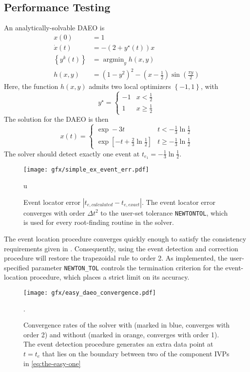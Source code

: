 \documentclass[twoside,leqno,twocolumn]{article}
\newcommand{\abs}[1]{\ensuremath{\left|#1\right|}}
\DeclareMathOperator*{\argmin}{\arg\min}
\begin{document}
\subsection{Performance Testing}
An analytically-solvable DAEO is
\begin{equation}
	\label{eq:the-easy-one}
	\begin{aligned}
		x(0) &= 1\\
		\dot x(t) &= -(2+y^\star(t))x\\
		\left\{y^k(t)\right\} &= \argmin_y h(x,y)\\
		h(x, y) &= (1-y^2)^2 - (x-\frac{1}{2})\sin\left(\frac{\pi y}{2}\right) 
	\end{aligned}
\end{equation}
Here, the function $h(x, y)$ admits two local optimizers $\left\{-1, 1\right\}$, with 
\begin{equation*}
	y^\star = \begin{cases}
		-1 & x<\frac{1}{2}\\
		1 & x \geq \frac{1}{2}
	\end{cases}
\end{equation*}
The solution for the DAEO is then
\begin{equation*}
	x(t) = \begin{cases}
		\exp-3t & t < -\frac{1}{3}\ln\frac{1}{2} \\
		\exp\left[-t + \frac{2}{3}\ln\frac{1}{2}\right] & t \geq -\frac{1}{3}\ln\frac{1}{2}
	\end{cases}
\end{equation*}
The solver should detect exactly one event at $t_{e_1} = -\frac{1}{3}\ln\frac{1}{2}$. 
\begin{figure}[h]
	\centering
	\texttt{[image: gfx/simple\_ex\_event\_err.pdf]}
	\caption{Event locator error $\abs{t_{e, calculated} - t_{e, exact}}$. The event locator error converges with order $\Delta t^2$ to the user-set tolerance \texttt{NEWTONTOL}, which is used for every root-finding routine in the solver.}
	\label{fig:easy-event-location}u
\end{figure}

The event location procedure converges quickly enough to satisfy the consistency requirements given in \cite{mannshardtOnestepMethodsAny1978}. Consequently, using the event detection and correction procedure will restore the trapezoidal rule to order 2. As implemented, the user-specified parameter \texttt{NEWTON\_TOL} controls the termination criterion for the event-location procedure, which places a strict limit on its accuracy.
\begin{figure}[h]
	\centering
	\texttt{[image: gfx/easy\_daeo\_convergence.pdf]}
	\caption{Convergence rates of the solver with (marked in blue, converges with order 2) and without (marked in orange, converges with order 1). The event detection procedure generates an extra data point at $t={t_e}$ that lies on the boundary between two of the component IVPs in \eqref{eq:the-easy-one}}.
	\label{fig:easy-error-improvement}
\end{figure}
\end{document}
